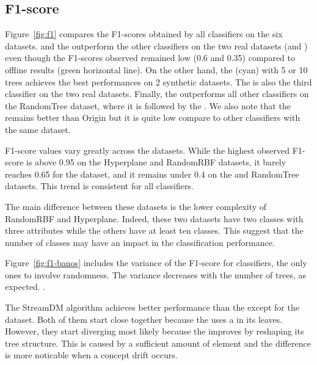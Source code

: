 \subsection{F1-score}
Figure~\ref{fig:f1} compares the F1-scores obtained by all classifiers on the
six datasets.  \naivebayes and the \hoeffdingtree outperform the other
classifiers on the two real datasets (\banosdataset and \recofitdataset) even
though the F1-scores observed remained low (0.6 and 0.35) compared to offline
results (green horizontal line). On the other hand, the \mondrianforest (cyan)
with 5 or 10 trees achieves the best performances on 2 synthetic datasets.  The
\mondrianforest is also the third classifier on the two real datasets.
Finally, the \hoeffdingtree outperforms all other classifiers on the RandomTree
dataset, where it is followed by the \mondrianforest. We also note that the
\FNN remains better than \mcnn Origin but it is quite low compare to other
classifiers with the same dataset.

F1-score values vary greatly across the datasets.  While the highest
observed F1-score is above 0.95 on the Hyperplane and RandomRBF datasets,
it barely reaches 0.65 for the \banosdataset dataset, and it remains under
0.4 on the \recofitdataset and RandomTree datasets. This trend is
consistent for all classifiers.

The main difference between these datasets is the lower complexity of RandomRBF
and Hyperplane. Indeed, these two datasets have two classes with three
attributes while the others have at least ten classes. This suggest that the
number of classes may have an impact in the classification performance.

Figure~\ref{fig:f1-banos} includes the variance of the F1-score for
\mondrianforest classifiers, the only ones to involve randomness. The
variance decreases with the number of trees, as expected.
.

The StreamDM \hoeffdingtree algorithm achieves better performance than the
\naivebayes except for the \banosdataset dataset.  Both of them start close
together because the \hoeffdingtree uses a \naivebayes in its leaves.  However,
they start diverging most likely because the \hoeffdingtree improves by reshaping its tree
structure.  This is caused by a sufficient amount of element and the difference
is more noticable when a concept drift occurs.

